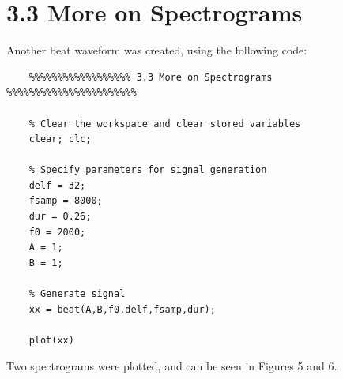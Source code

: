 \documentclass{article}
\begin{document}
\section{3.3 More on Spectrograms}
Another beat waveform was created, using the following code:
\begin{lstlisting}
	%%%%%%%%%%%%%%%%%% 3.3 More on Spectrograms %%%%%%%%%%%%%%%%%%%%%%%
	
	% Clear the workspace and clear stored variables
	clear; clc;
	
	% Specify parameters for signal generation
	delf = 32;
	fsamp = 8000;
	dur = 0.26;
	f0 = 2000;
	A = 1;
	B = 1;
	
	% Generate signal
	xx = beat(A,B,f0,delf,fsamp,dur);
	
	plot(xx)
\end{lstlisting}

Two spectrograms were plotted, and can be seen in Figures 5 and 6.
\end{document}
